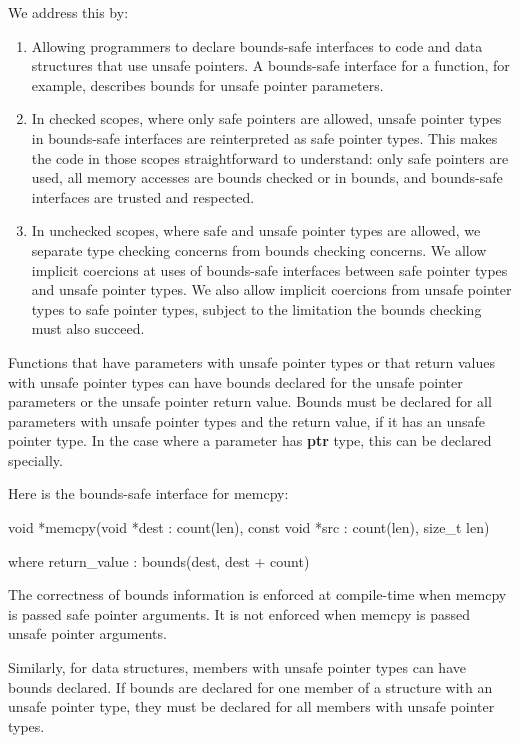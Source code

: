 \documentclass[]{article}
\begin{document}
We address this by:

\begin{enumerate}
\def\labelenumi{\arabic{enumi}.}
\item
  Allowing programmers to declare bounds-safe interfaces to code and
  data structures that use unsafe pointers. A bounds-safe interface for
  a function, for example, describes bounds for unsafe pointer
  parameters.
\item
  In checked scopes, where only safe pointers are allowed, unsafe
  pointer types in bounds-safe interfaces are reinterpreted as safe
  pointer types. This makes the code in those scopes straightforward to
  understand: only safe pointers are used, all memory accesses are
  bounds checked or in bounds, and bounds-safe interfaces are trusted
  and respected.
\item
  In unchecked scopes, where safe and unsafe pointer types are allowed,
  we separate type checking concerns from bounds checking concerns. We
  allow implicit coercions at uses of bounds-safe interfaces between
  safe pointer types and unsafe pointer types. We also allow implicit
  coercions from unsafe pointer types to safe pointer types, subject to
  the limitation the bounds checking must also succeed.
\end{enumerate}

Functions that have parameters with unsafe pointer types or that return
values with unsafe pointer types can have bounds declared for the unsafe
pointer parameters or the unsafe pointer return value. Bounds must be
declared for all parameters with unsafe pointer types and the return
value, if it has an unsafe pointer type. In the case where a parameter
has \textbf{ptr} type, this can be declared specially.

Here is the bounds-safe interface for memcpy:

void *memcpy(void *dest : count(len), const void *src : count(len),
size\_t len)

where return\_value : bounds(dest, dest + count)

The correctness of bounds information is enforced at compile-time when
memcpy is passed safe pointer arguments. It is not enforced when memcpy
is passed unsafe pointer arguments.

Similarly, for data structures, members with unsafe pointer types can
have bounds declared. If bounds are declared for one member of a
structure with an unsafe pointer type, they must be declared for all
members with unsafe pointer types.
\end{document}
